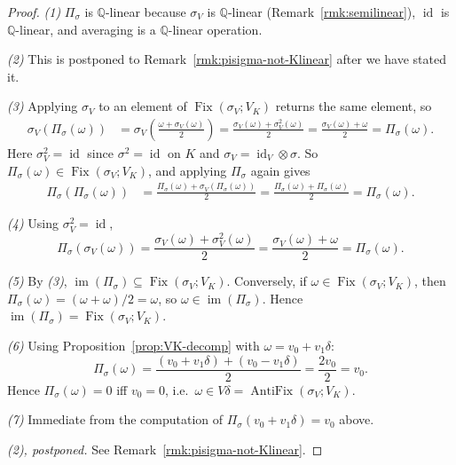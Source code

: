 \documentclass[11pt, a4paper]{amsart}
\theoremstyle{definition}
\newcommand{\Q}{\mathbb{Q}}
\newcommand{\Fix}{\operatorname{Fix}}
\newcommand{\id}{\operatorname{id}}
\newcommand{\im}{\operatorname{im}}
\begin{document}
\begin{proof}
\emph{(1)} $\Pi_\sigma$ is $\Q$-linear because $\sigma_V$ is
$\Q$-linear (Remark~\ref{rmk:semilinear}), $\id$ is $\Q$-linear, and
averaging is a $\Q$-linear operation.

\emph{(2)} This is postponed to Remark~\ref{rmk:pisigma-not-Klinear}
after we have stated it.

\emph{(3)} Applying $\sigma_V$ to an element of
$\Fix(\sigma_V; V_K)$ returns the same element, so
\begin{align*}
  \sigma_V(\Pi_\sigma(\omega))
  &= \sigma_V\!\left(\frac{\omega + \sigma_V(\omega)}{2}\right)
  = \frac{\sigma_V(\omega) + \sigma_V^2(\omega)}{2}
  = \frac{\sigma_V(\omega) + \omega}{2}
  = \Pi_\sigma(\omega).
\end{align*}
Here $\sigma_V^2 = \id$ since $\sigma^2 = \id$ on $K$ and
$\sigma_V = \id_V \otimes \sigma$. So $\Pi_\sigma(\omega) \in
\Fix(\sigma_V; V_K)$, and applying $\Pi_\sigma$ again gives
\begin{align*}
  \Pi_\sigma(\Pi_\sigma(\omega))
  &= \frac{\Pi_\sigma(\omega) + \sigma_V(\Pi_\sigma(\omega))}{2}
  = \frac{\Pi_\sigma(\omega) + \Pi_\sigma(\omega)}{2}
  = \Pi_\sigma(\omega).
\end{align*}

\emph{(4)} Using $\sigma_V^2 = \id$,
\[
  \Pi_\sigma(\sigma_V(\omega))
  = \frac{\sigma_V(\omega) + \sigma_V^2(\omega)}{2}
  = \frac{\sigma_V(\omega) + \omega}{2}
  = \Pi_\sigma(\omega).
\]

\emph{(5)} By \emph{(3)}, $\im(\Pi_\sigma) \subseteq
\Fix(\sigma_V; V_K)$. Conversely, if $\omega \in \Fix(\sigma_V; V_K)$,
then $\Pi_\sigma(\omega) = (\omega + \omega)/2 = \omega$, so
$\omega \in \im(\Pi_\sigma)$. Hence $\im(\Pi_\sigma) = \Fix(\sigma_V;
V_K)$.

\emph{(6)} Using Proposition~\ref{prop:VK-decomp} with $\omega =
v_0 + v_1 \delta$:
\[
  \Pi_\sigma(\omega)
  = \frac{(v_0 + v_1 \delta) + (v_0 - v_1 \delta)}{2}
  = \frac{2 v_0}{2} = v_0.
\]
Hence $\Pi_\sigma(\omega) = 0$ iff $v_0 = 0$, i.e.\ $\omega \in
V\delta = \operatorname{AntiFix}(\sigma_V; V_K)$.

\emph{(7)} Immediate from the computation of $\Pi_\sigma(v_0 + v_1
\delta) = v_0$ above.

\emph{(2), postponed.} See Remark~\ref{rmk:pisigma-not-Klinear}.
\end{proof}
\end{document}
